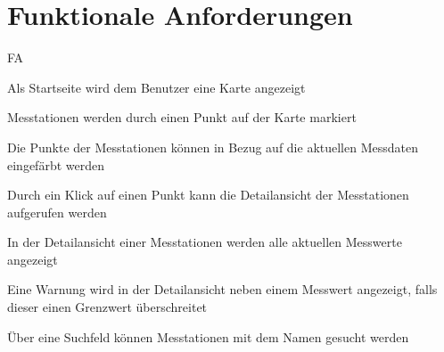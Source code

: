 \section{Funktionale Anforderungen}

\setcounter{counter}{10}
\begin{Kriterien}{FA}
    \item Als Startseite wird dem Benutzer eine Karte angezeigt
    \item Messtationen werden durch einen Punkt auf der Karte markiert
    \item Die Punkte der Messtationen können in Bezug auf die aktuellen Messdaten eingefärbt werden
    \item Durch ein Klick auf einen Punkt kann die Detailansicht der Messtationen aufgerufen werden
    \item In der Detailansicht einer Messtationen werden alle aktuellen Messwerte angezeigt
    \item Eine Warnung wird in der Detailansicht neben einem Messwert angezeigt, falls dieser einen Grenzwert überschreitet
    \item Über eine Suchfeld können Messtationen mit dem Namen gesucht werden
    \item 
\end{Kriterien}